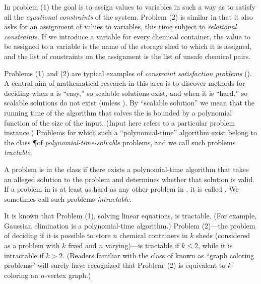 In problem (1)
the goal is to assign values to variables in such a way as to satisfy 
all the \emph{equational constraints} of the system.
Problem (2) is similar in that it
also asks for an assignment of values to variables, this time subject to
\emph{relational constraints}. If we introduce a variable for every chemical container, 
the value to be assigned to a variable is the name of the storage shed
to which it is assigned, and the list of constraints on the assignment
is the list of unsafe chemical pairs.

Problems (1) and (2) are typical examples of
{\it constraint satisfaction problems} (\csps).
A central aim of mathematical research in this area is to discover
methods for deciding when a \csp is ``easy,'' so scalable
solutions exist, and when it is ``hard,'' so scalable solutions do not exist
(unless \PeqNP).
By ``scalable solution'' we mean that the running time of the
algorithm that solves the \csp is bounded by a polynomial function of the
size of the input. (Input here refers to a particular problem instance.)
Problems for which such a ``polynomial-time'' algorithm exist belong to the 
class \P of \emph{polynomial-time-solvable} problems, and we call such
problems \emph{tractable}.

A problem is in the class \NP if there exists a polynomial-time
algorithm that takes an alleged solution to the problem and determines whether
that solution is valid.  If a problem in \NP is
at least as hard as any other problem in \NP, it is called \emph{\NPcomplete}.
We sometimes call such problems \emph{intractable}.

It is known that Problem (1), solving linear equations, is tractable.
(For example, Gaussian elimination is a polynomial-time algorithm.)
Problem (2)---the problem of deciding if it is possible to store
$n$ chemical containers in $k$ sheds (considered as a problem
with $k$ fixed and $n$ varying)---is tractable if $k\leq 2$,
while it is intractable if $k>2$.
(Readers familiar with the class of \csps known as ``graph coloring problems''
will surely have recognized that Problem~(2) is equivalent to
$k$-coloring an $n$-vertex graph.) 



